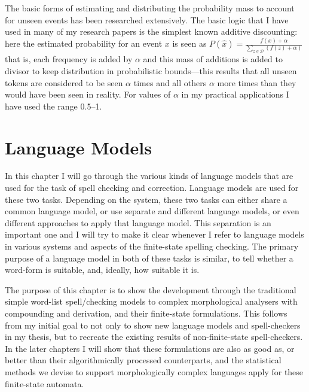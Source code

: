 \documentclass[officiallayout]{unihelcompling}
\begin{document}
The basic forms of estimating and distributing the probability mass to account
for unseen events has been researched extensively. The basic logic that I have
used in many of my research papers is the simplest known additive discounting:
here the estimated probability for an event $x$ is seen as $P(\hat{x}) =
\frac{f(x) + \alpha}{\sum_{z \in \mathcal{D}}(f(z) + \alpha)}$ that is, each
frequency is added by $\alpha$ and this mass of additions is added to divisor
to keep distribution in probabilistic bounds---this results that all unseen
tokens are considered to be seen $\alpha$ times and all others $\alpha$ more
times than they would have been seen in reality. For values of $\alpha$ in
my practical applications I have used the range 0.5--1.



\chapter{Language Models}
\label{chap:language-models}

In this chapter I will go through the various kinds of language models that are
used for the task of spell checking and correction. Language models are used
for these two tasks. Depending on the system, these two tasks can either share
a common language model, or use separate and different language models, or even
different approaches to apply that language model. This separation is an
important one and I will try to make it clear whenever I refer to language
models in various systems and aspects of the finite-state spelling checking.
The primary purpose of a language model in both of these tasks is similar, to
tell whether a word-form is suitable, and, ideally, how suitable it is.

The purpose of this chapter is to show the development through the traditional
simple word-list spell\-/checking models to complex morphological analysers with
compounding and derivation, and their finite-state formulations. This follows
from my initial goal to not only to show new language models and spell-checkers
in my thesis, but to recreate the existing results of non-finite-state
spell-checkers. In the later chapters I will show that these formulations are
also as good as, or better than their algorithmically processed counterparts,
and the statistical methods we devise to support morphologically complex
languages apply for these finite-state automata.
\end{document}

